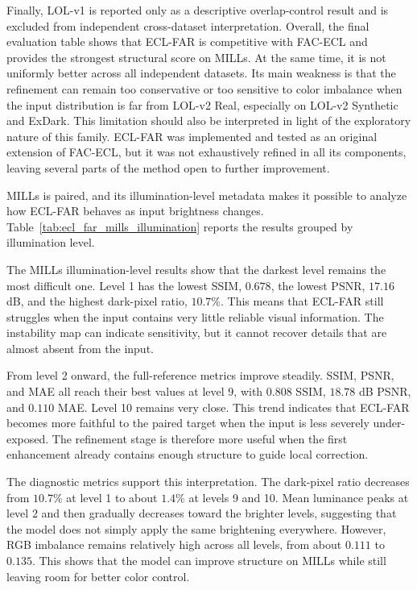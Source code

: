 Finally, LOL-v1 is reported only as a descriptive overlap-control result and is excluded from independent cross-dataset interpretation. Overall, the final evaluation table shows that ECL-FAR is competitive with FAC-ECL and provides the strongest structural score on MILLs. At the same time, it is not uniformly better across all independent datasets. Its main weakness is that the refinement can remain too conservative or too sensitive to color imbalance when the input distribution is far from LOL-v2 Real, especially on LOL-v2 Synthetic and ExDark. This limitation should also be interpreted in light of the exploratory nature of this family. ECL-FAR was implemented and tested as an original extension of FAC-ECL, but it was not exhaustively refined in all its components, leaving several parts of the method open to further improvement.

MILLs is paired, and its illumination-level metadata makes it possible to analyze how ECL-FAR behaves as input brightness changes. Table~\ref{tab:ecl_far_mills_illumination} reports the results grouped by illumination level.



The MILLs illumination-level results show that the darkest level remains the most difficult one. Level 1 has the lowest SSIM, $0.678$, the lowest PSNR, $17.16$ dB, and the highest dark-pixel ratio, $10.7\%$. This means that ECL-FAR still struggles when the input contains very little reliable visual information. The instability map can indicate sensitivity, but it cannot recover details that are almost absent from the input.

From level 2 onward, the full-reference metrics improve steadily. SSIM, PSNR, and MAE all reach their best values at level 9, with $0.808$ SSIM, $18.78$ dB PSNR, and $0.110$ MAE. Level 10 remains very close. This trend indicates that ECL-FAR becomes more faithful to the paired target when the input is less severely under-exposed. The refinement stage is therefore more useful when the first enhancement already contains enough structure to guide local correction.

The diagnostic metrics support this interpretation. The dark-pixel ratio decreases from $10.7\%$ at level 1 to about $1.4\%$ at levels 9 and 10. Mean luminance peaks at level 2 and then gradually decreases toward the brighter levels, suggesting that the model does not simply apply the same brightening everywhere. However, RGB imbalance remains relatively high across all levels, from about $0.111$ to $0.135$. This shows that the model can improve structure on MILLs while still leaving room for better color control.


